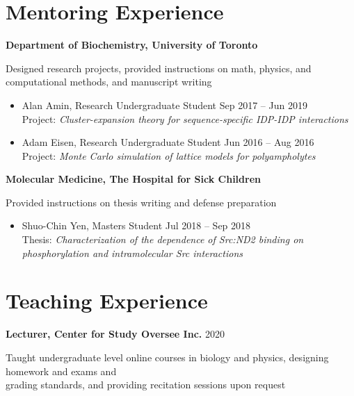 \documentclass[11pt]{../yhlcv}
\begin{document}
\section*{Mentoring Experience}

{\bf Department of Biochemistry, University of Toronto} \vspace{0.25em}

Designed research projects, provided instructions on math, physics, and computational methods, 
and manuscript writing
\vspace{-0.7em}\\
\begin{itemize}[leftmargin=*]\itemsep-0.2em
\item Alan Amin, %
Research Undergraduate Student
\hfill Sep 2017 -- Jun 2019 \\
Project: {\it Cluster-expansion theory for sequence-specific IDP-IDP interactions}

\item Adam Eisen, %
Research Undergraduate Student
\hfill Jun 2016 -- Aug 2016 \\
Project: {\it Monte Carlo simulation of lattice models for polyampholytes} 
\end{itemize}

{\bf Molecular Medicine, The Hospital for Sick Children} \vspace{0.25em}

Provided instructions on thesis writing and defense preparation
\vspace{-0.7em}\\
\begin{itemize}[leftmargin=*]\itemsep-0.2em
\item Shuo-Chin Yen, 
Masters Student 
\hfill Jul 2018 -- Sep 2018 \\
Thesis: {\it Characterization of the dependence of Src:ND2 binding on 
	phosphorylation and intramolecular Src interactions} 
\end{itemize}


\section*{Teaching Experience}

{\bf Lecturer, Center for Study Oversee Inc. } \hfill 2020\vspace{0.5em}

Taught undergraduate level online courses in biology and physics, designing homework and exams
and \\ grading standards, and providing recitation sessions upon request  \vspace{0.5em}
\end{document}
